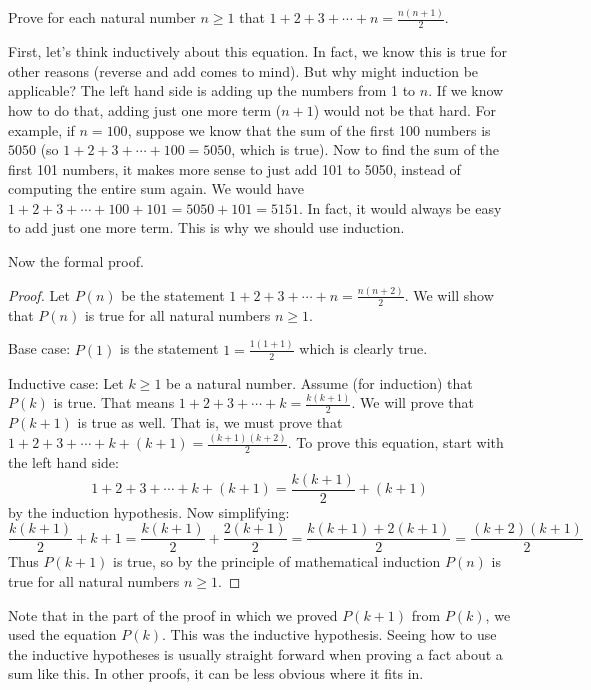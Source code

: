 \documentclass[12pt]{article}
\begin{document}
\begin{example}
  Prove for each natural number $n \ge 1$ that $1 + 2 + 3 + \cdots + n = \frac{n(n+1)}{2}$.
  
  \begin{solution}
	First, let's think inductively about this equation.  In fact, we know this is true for other reasons (reverse and add comes to mind).  But why might induction be applicable?  The left hand side is adding up the numbers from 1 to $n$.  If we know how to do that, adding just one more term ($n+1$) would not be that hard.  For example, if $n = 100$, suppose we know that the sum of the first 100 numbers is $5050$ (so $1 + 2 + 3 + \cdots + 100 = 5050$, which is true).  Now to find the sum of the first 101 numbers, it makes more sense to just add 101 to 5050, instead of computing the entire sum again.  We would have $1 + 2 + 3 + \cdots + 100 + 101 = 5050 + 101 = 5151$.  In fact, it would always be easy to add just one more term.  This is why we should use induction.  
	
	Now the formal proof.
  \begin{proof}
    Let $P(n)$ be the statement $1 + 2 + 3 + \cdots + n = \frac{n(n+2)}{2}$.  We will show that $P(n)$ is true for all natural numbers $n \ge 1$.
    
    Base case: $P(1)$ is the statement $1 = \frac{1(1+1)}{2}$ which is clearly true.
    
    Inductive case: Let $k \ge 1$ be a natural number.  Assume (for induction) that $P(k)$ is true.  That means $1 + 2 + 3 + \cdots + k = \frac{k(k+1)}{2}$.  We will prove that $P(k+1)$ is true as well.  That is, we must prove that $1 + 2 + 3 + \cdots + k + (k+1) = \frac{(k+1)(k+2)}{2}$.  To prove this equation, start with the left hand side:
    \[1 + 2 + 3 + \cdots + k + (k+1) = \frac{k(k+1)}{2} + (k+1)\]
    by the induction hypothesis.  Now simplifying:
    \[\frac{k(k+1)}{2} + k+1 = \frac{k(k+1)}{2} + \frac{2(k+1)}{2} = \frac{k(k+1) + 2(k+1)}{2} = \frac{(k+2)(k+1)}{2}\]
    Thus $P(k+1)$ is true, so by the principle of mathematical induction $P(n)$ is true for all natural numbers $n \ge 1$.
  \end{proof}
  
    \end{solution}
\end{example}

 Note that in the part of the proof in which we proved $P(k+1)$ from $P(k)$, we used the equation $P(k)$.  This was the inductive hypothesis.  Seeing how to use the inductive hypotheses is usually straight forward when proving a fact about a sum like this.  In other proofs, it can be less obvious where it fits in.
 
\end{document}
